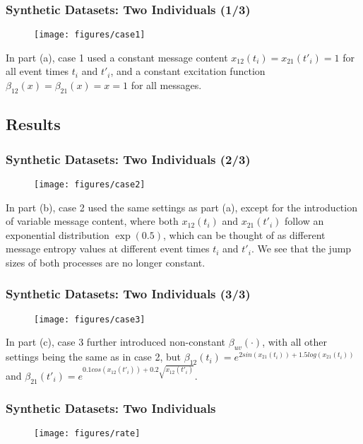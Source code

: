 \documentclass{beamer}
\begin{document}
\begin{frame}
\frametitle{Synthetic Datasets: Two Individuals (1/3)}
\begin{figure}
  \centering  
	\texttt{[image: figures/case1]}
  \label{fi: example 1}
\end{figure}
In part (a), case 1 used a constant message content $x_{12}(t_i) = x_{21}(t'_i) = 1$ for all event times $t_i$ and $t'_i$, and a constant excitation function $\beta_{12}(x) = \beta_{21}(x) = x = 1$ for all messages.
\end{frame}

\subsection{Results}
\begin{frame}
\frametitle{Synthetic Datasets: Two Individuals (2/3)}
\begin{figure}
  \centering  
	\texttt{[image: figures/case2]}
  \label{fi: example 1}
\end{figure}
In part (b), case 2 used the same settings as part (a), except for the introduction of variable message content, where both $x_{12}(t_i)$ and $x_{21}(t'_i)$ follow an exponential distribution $\exp(0.5)$, which can be thought of as different message entropy values at different event times $t_i$ and $t'_i$. We see that the jump sizes of both processes are no longer constant.
\end{frame}

\begin{frame}
\frametitle{Synthetic Datasets: Two Individuals (3/3)}
\begin{figure}
  \centering  
	\texttt{[image: figures/case3]}
  \label{fi: example 1}
\end{figure}
In part (c), case 3 further introduced non-constant $\beta_{uv}(\cdot)$, with all other settings being the same as in case 2, but $\beta_{12}(t_i) = e^{2sin(x_{21}(t_i)) + 1.5log(x_{21}(t_i))}$ and $\beta_{21}(t'_i) = e^{0.1cos(x_{12}(t'_i)) + 0.2\sqrt{x_{12}(t'_i)}}$.

\end{frame}


\begin{frame}
\frametitle{Synthetic Datasets: Two Individuals}
\begin{figure}
  \centering  
	\texttt{[image: figures/rate]}
  \label{fi: example 1}
\end{figure}
\end{frame}
\end{document}
